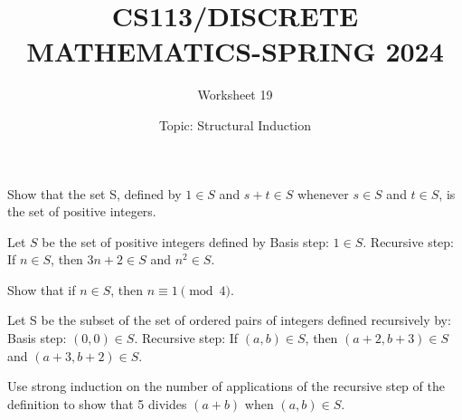 \documentclass{exam}
\title{CS113/DISCRETE MATHEMATICS-SPRING 2024}
\author{Worksheet 19}
\date{Topic: Structural Induction}
\begin{document}
\maketitle

\begin{center}
\end{center}

\vspace{5mm}

\vspace{5mm}

\vspace{5mm}
\begin{questions}


\question Show that the set S, defined by $1 \in S$ and $s + t \in S$ whenever $s \in S$ and $t \in S$, is the set of positive integers.

\vspace{9in}

\question Let $S$ be the set of positive integers defined by
Basis step: $1 \in S$.
Recursive step: If $n \in S$, then $3n + 2 \in S$ and $n^2 \in S$.

Show that if $n \in S$, then $n \equiv 1 \pmod{4}$.
\vspace{9in}


\question
Let S be the subset of the set of ordered pairs of integers defined recursively by:
Basis step: $(0, 0) \in S$.
Recursive step: If $(a, b) \in S$, then $(a + 2, b + 3) \in S$ and $(a + 3, b + 2) \in S$.

Use strong induction on the number of applications of the recursive step of the definition to show that 5 divides $(a + b)$ when $(a, b) \in S$.



\end{questions}
\end{document}
